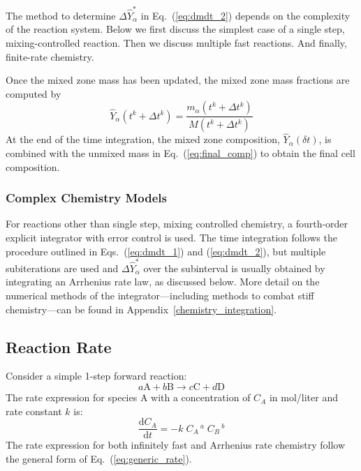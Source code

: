 The method to determine $\Delta \hat{Y}_\alpha^*$ in Eq.~(\ref{eq:dmdt_2}) depends on the complexity of the reaction system.  Below we first discuss the simplest case of a single step, mixing-controlled reaction.  Then we discuss multiple fast reactions.  And finally, finite-rate chemistry.

Once the mixed zone mass has been updated, the mixed zone mass fractions are computed by
\begin{equation}
\label{eq:mixed_mass_fraction_sub}
\hat{Y}_\alpha(t^k + \Delta t^k) = \frac{m_\alpha(t^k + \Delta t^k)}{M(t^k + \Delta t^k)}
\end{equation}
At the end of the time integration, the mixed zone composition, $\hat{Y}_\alpha(\delta t)$, is combined with the unmixed mass in Eq.~(\ref{eq:final_comp}) to obtain the final cell composition.


\subsubsection{Complex Chemistry Models}

For reactions other than single step, mixing controlled chemistry, a fourth-order explicit integrator with error control is used. The time integration follows the procedure outlined in Eqs.~(\ref{eq:dmdt_1}) and (\ref{eq:dmdt_2}), but multiple subiterations are used and $\Delta \hat{Y}_\alpha^*$ over the subinterval is usually obtained by integrating an Arrhenius rate law, as discussed below. More detail on the numerical methods of the integrator---including methods to combat stiff chemistry---can be found in Appendix~\ref{chemistry_integration}.

\subsection{Reaction Rate} 
\label{Reaction_Rate_Model}
Consider a simple 1-step forward reaction:
\begin{equation}\label{eq:generic_1step}
a\mathrm{A} + b\mathrm{B} \rightarrow c\mathrm{C} + d\mathrm{D}
\end{equation}
The rate expression for species A with a concentration of $C_{A}$ in mol/liter and rate constant $k$ is:
\begin{equation}\label{eq:generic_rate}
\frac{\mbox{d}C_{A}}{\mbox{d}t}= -k\; C_{A}\,^{a}\; C_{B}\,^{b}
\end{equation}
The rate expression for both infinitely fast and Arrhenius rate chemistry follow the general form of Eq.~(\ref{eq:generic_rate}).

